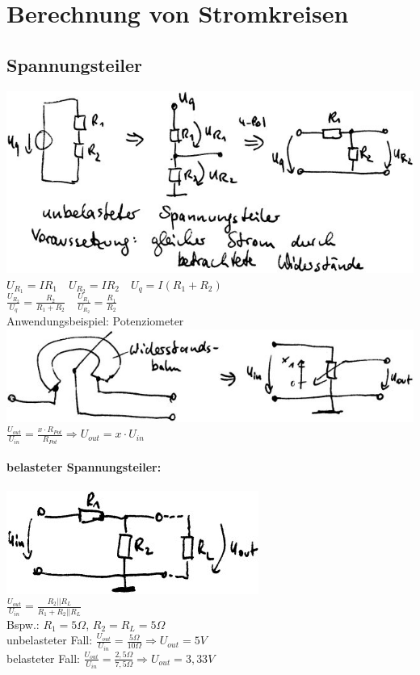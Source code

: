 \section{Berechnung von Stromkreisen}

\subsection{Spannungsteiler}

\includegraphics[scale=.75]{Abbildungen/ABB209}\\
$U_{R_1}=IR_1 \quad U_{R_2}=IR_2 \quad U_q= I(R_1+R_2)$\\
$\frac{U_{R_2}}{U_q}=\frac{R_2}{R_1+R_2} \quad \frac{U_{R_1}}{U_{R_2}}=\frac{R_1}{R_2}$\\
Anwendungsbeispiel: Potenziometer\\
\includegraphics[scale=.75]{Abbildungen/ABB210}\\
$\frac{U_{out}}{U_{in}}=\frac{x\cdot R_{Pot}}{R_{Pot}}\Rightarrow U_{out} = x \cdot U_{in}$
\paragraph{belasteter Spannungsteiler:}\parskp
\includegraphics[scale=.75]{Abbildungen/ABB211}\\
$\frac{U_{out}}{U_{in}}=\frac{R_2||R_L}{R_1+R_2||R_L}$\\
Bspw.: $R_1=5 \Omega$, $R_2=R_L=5 \Omega$\\
unbelasteter Fall: $\frac{U_{out}}{U_{in}}=\frac{5 \Omega}{10 \Omega} \Rightarrow U_{out}=5V$\\
belasteter Fall: $\frac{U_{out}}{U_{in}}=\frac{2,5 \Omega}{7,5 \Omega}\Rightarrow U_{out}=3,33V$

